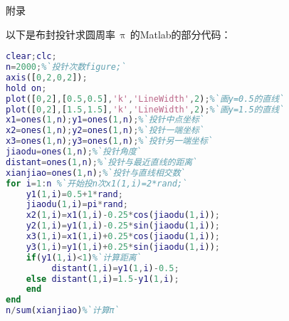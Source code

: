 \appendix
\label{cod:matlab}
\newpage
\vspace*{-21.6pt}
\begin{center}
\heiti
{}%
附录
\end{center}

以下是布封投针求圆周率\,$\uppi$\,的Matlab的部分代码：

\begin{lstlisting}[language=Matlab]
clear;clc;
n=2000;%`投针次数figure;`
axis([0,2,0,2]);
hold on;
plot([0,2],[0.5,0.5],'k','LineWidth',2);%`画y=0.5的直线`
plot([0,2],[1.5,1.5],'k','LineWidth',2);%`画y=1.5的直线`
x1=ones(1,n);y1=ones(1,n);%`投针中点坐标`
x2=ones(1,n);y2=ones(1,n);%`投针一端坐标`
x3=ones(1,n);y3=ones(1,n);%`投针另一端坐标`
jiaodu=ones(1,n);%`投针角度`
distant=ones(1,n);%`投针与最近直线的距离`
xianjiao=ones(1,n);%`投针与直线相交数`
for i=1:n %`开始投n次x1(1,i)=2*rand;`
    y1(1,i)=0.5+1*rand;
    jiaodu(1,i)=pi*rand;
    x2(1,i)=x1(1,i)-0.25*cos(jiaodu(1,i));
    y2(1,i)=y1(1,i)-0.25*sin(jiaodu(1,i));
    x3(1,i)=x1(1,i)+0.25*cos(jiaodu(1,i));
    y3(1,i)=y1(1,i)+0.25*sin(jiaodu(1,i));
    if(y1(1,i)<1)%`计算距离`
         distant(1,i)=y1(1,i)-0.5;
    else distant(1,i)=1.5-y1(1,i);
    end
end
n/sum(xianjiao)%`计算π`
\end{lstlisting}
